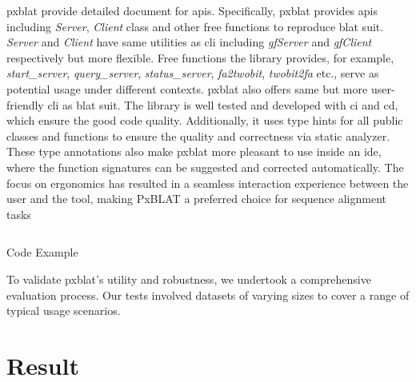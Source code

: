 \gls{pxblat} provide detailed document for \glspl{api}.
Specifically, \gls{pxblat} provides \glspl{api} including  \emph{Server}, \emph{Client} class and other free functions to reproduce \gls{blat} suit.
\emph{Server} and \emph{Client} have same utilities as \gls{cli} including \emph{gfServer} and \emph{gfClient} respectively but more flexible.
Free functions the library provides, for example, \emph{start\_server}, \emph{query\_server}, \emph{status\_server}, \emph{fa2twobit}, \emph{twobit2fa} etc., serve as potential usage under different contexts.
\gls{pxblat} also offers same but more user-friendly \gls{cli} as \gls{blat} suit.
The library is well tested and developed with \gls{ci} and \gls{cd}, which ensure the good code quality.
Additionally, it uses type hints for all public classes and functions to ensure the quality and correctness via static analyzer.
These type annotations also make \gls{pxblat} more pleasant to use inside an \gls{ide}, where the function signatures can be suggested and corrected automatically.
The focus on ergonomics has resulted in a seamless interaction experience between the user and the tool, making PxBLAT a preferred choice for sequence alignment tasks


\begin{listing}
	\inputminted[linenos]{python}{codes/example1.py}
	\caption{Code Example}
	\label{listing:example}
\end{listing}


To validate \gls{pxblat}'s utility and robustness, we undertook a comprehensive evaluation process.
Our tests involved datasets of varying sizes to cover a range of typical usage scenarios.

\section*{Result}\label{sec:result}

